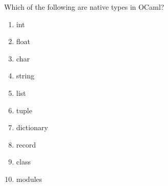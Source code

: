 \question Which of the following are native types in OCaml?
\begin{enumerate}
\item int
\item float
\item char
\item string
\item list
\item tuple
\item dictionary
\item record
\item class
\item modules
\end{enumerate}
